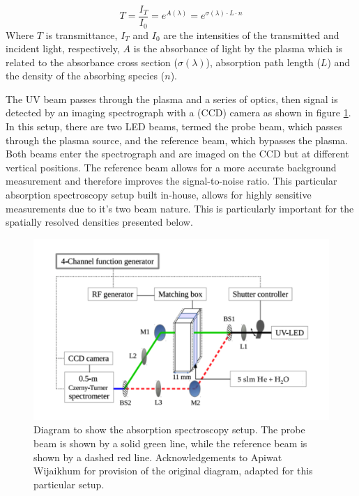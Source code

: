 \documentclass[11pt, oneside]{article}   	%
\begin{document}
\begin{equation} \label{eqn:Transmittance}
    T= \frac{I_T}{I_0} = e^{A(\lambda)} = e^{\sigma(\lambda) \cdot L \cdot n}
\end{equation}
Where $T$ is transmittance, $I_T$ and $I_0$ are the intensities of the transmitted and incident light, respectively, $A$ is the absorbance of light by the plasma which is related to the absorbance cross section ($\sigma(\lambda)$), absorption path length ($L$) and the density of the absorbing species ($n$).

The UV beam passes through the plasma and a series of optics, then signal is detected by an imaging spectrograph with a (CCD) camera as shown in figure \ref{fig:Setup}. 
In this setup, there are two LED beams, termed the probe beam, which passes through the plasma source, and the reference beam, which bypasses the plasma.
Both beams enter the spectrograph and are imaged on the CCD but at different vertical positions.
The reference beam allows for a more accurate background measurement and therefore improves the signal-to-noise ratio.
This particular absorption spectroscopy setup built in-house, allows for highly sensitive measurements due to it's two beam nature.
This is particularly important for the spatially resolved densities presented below.

\begin{figure}
	\includegraphics[width=\textwidth]{Figures/SetupfromApiwat}
	\caption{Diagram to show the absorption spectroscopy setup. The probe beam is shown by a solid green line, while the reference beam is shown by a dashed red line. Acknowledgements to Apiwat Wijaikhum for provision of the original diagram, adapted for this particular setup.}
	\label{fig:Setup}
\end{figure} 
\end{document}
